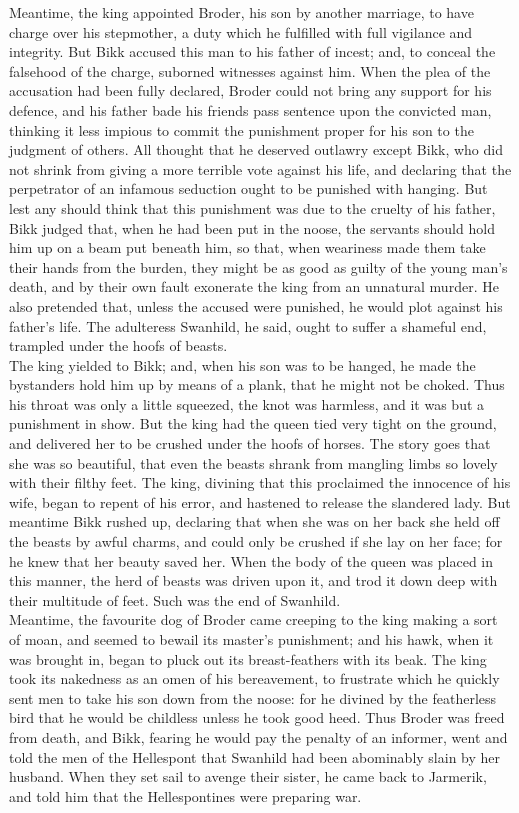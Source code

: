 \documentclass[10pt,a4paper]{report}
\begin{document}
Meantime, the king appointed Broder, his son by another marriage, to have charge over his stepmother, a duty which he fulfilled with full vigilance and integrity. But Bikk accused this man to his father of incest; and, to conceal the falsehood of the charge, suborned witnesses against him. When the plea of the accusation had been fully declared, Broder could not bring any support for his defence, and his father bade his friends pass sentence upon the convicted man, thinking it less impious to commit the punishment proper for his son to the judgment of others. All thought that he deserved outlawry except Bikk, who did not shrink from giving a more terrible vote against his life, and declaring that the perpetrator of an infamous seduction ought to be punished with hanging. But lest any should think that this punishment was due to the cruelty of his father, Bikk judged that, when he had been put in the noose, the servants should hold him up on a beam put beneath him, so that, when weariness made them take their hands from the burden, they might be as good as guilty of the young man's death, and by their own fault exonerate the king from an unnatural murder. He also pretended that, unless the accused were punished, he would plot against his father's life. The adulteress Swanhild, he said, ought to suffer a shameful end, trampled under the hoofs of beasts.\\

The king yielded to Bikk; and, when his son was to be hanged, he made the bystanders hold him up by means of a plank, that he might not be choked. Thus his throat was only a little squeezed, the knot was harmless, and it was but a punishment in show. But the king had the queen tied very tight on the ground, and delivered her to be crushed under the hoofs of horses. The story goes that she was so beautiful, that even the beasts shrank from mangling limbs so lovely with their filthy feet. The king, divining that this proclaimed the innocence of his wife, began to repent of his error, and hastened to release the slandered lady. But meantime Bikk rushed up, declaring that when she was on her back she held off the beasts by awful charms, and could only be crushed if she lay on her face; for he knew that her beauty saved her. When the body of the queen was placed in this manner, the herd of beasts was driven upon it, and trod it down deep with their multitude of feet. Such was the end of Swanhild.\\

Meantime, the favourite dog of Broder came creeping to the king making a sort of moan, and seemed to bewail its master's punishment; and his hawk, when it was brought in, began to pluck out its breast-feathers with its beak. The king took its nakedness as an omen of his bereavement, to frustrate which he quickly sent men to take his son down from the noose: for he divined by the featherless bird that he would be childless unless he took good heed. Thus Broder was freed from death, and Bikk, fearing he would pay the penalty of an informer, went and told the men of the Hellespont that Swanhild had been abominably slain by her husband. When they set sail to avenge their sister, he came back to Jarmerik, and told him that the Hellespontines were preparing war.\\
\end{document}
